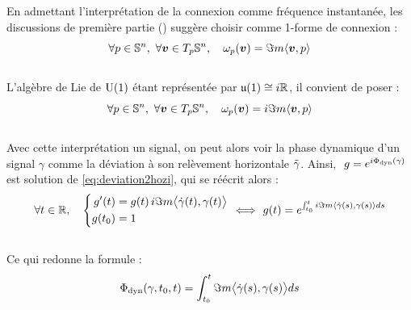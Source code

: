 En admettant l'interprétation de la connexion comme fréquence instantanée, les discussions de première partie () suggère choisir comme 1-forme de connexion :
\[\forall p\in\S{n},\ \forall \bf{v}\in\tg[p]{\S{n}},\quad \conn_p(\bf{v}) = \Im m \langle \bf{v}, p\rangle\]
\\
L'algèbre de Lie de $\U{1}$ étant représentée par $\mathfrak{u}(1)\cong i\R$, il convient de poser :
\begin{equation} \label{eq:conn2SUPC}
	\forall p\in\S{n},\ \forall \bf{v}\in\tg[p]{\S{n}},\quad \conn_p(\bf{v}) = i\Im m \langle \bf{v}, p\rangle
\end{equation}
\\
Avec cette interprétation un signal, on peut alors voir la phase dynamique d'un signal $\gamma$ comme la déviation à son relèvement horizontale $\Tilde{\gamma}$. Ainsi, $\ g = e^{i\phased(\gamma)}\ $ est solution de \eqref{eq:deviation2hozi}, qui se réécrit alors :
\[\forall t\in\R,\quad \left\{ \begin{aligned}
	g'(t)  &= g(t)\, i\Im m \big\langle \dot{\gamma}(t) , \gamma(t) \big\rangle \\
	g(t_0) &= 1
\end{aligned}\ \right. \Llr\ g(t) = e^{\int_{t_0}^t i\Im m\langle \dot{\gamma}(s) , \gamma(s) \rangle ds}\]
\\
Ce qui redonne la formule :
\begin{equation}\label{eq:phased_vgeodiff}
	\phased(\gamma, t_0, t) = \int_{t_0}^t \Im m\big\langle \dot{\gamma}(s) , \gamma(s) \big\rangle ds
\end{equation}
\\

